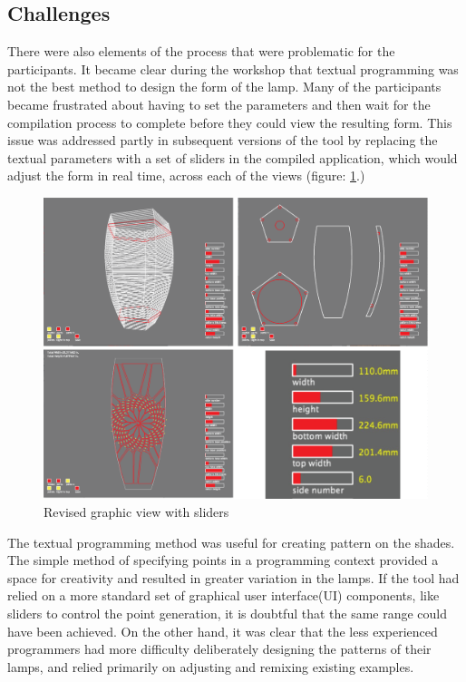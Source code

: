 \subsection{Challenges}
There were also elements of the process that were problematic for the participants. It became clear during the workshop that textual programming was not the best method to design the form of the lamp. Many of the participants became frustrated about having to set the parameters and then wait for the compilation process to complete before they could view the resulting form. This issue was addressed partly in subsequent versions of the tool by replacing the textual parameters with a set of sliders in the compiled application, which would adjust the form in real time, across each of the views (figure: \ref{fig:slider_interface}.)
\begin{center}
\begin{figure}[h!]
\includegraphics[width=\columnwidth]{images/slider_interface.png}
\caption{Revised graphic view with sliders}
\label{fig:slider_interface}
\end{figure}
\end{center}

The textual programming method was useful for creating pattern on the shades. The simple method of specifying points in a programming context provided a space for creativity and resulted in greater variation in the lamps. If the tool had relied on a more standard set of graphical user interface(UI) components, like sliders to control the point generation, it is doubtful that the same range could have been achieved. On the other hand, it was clear that the less experienced programmers had more difficulty deliberately designing the patterns of their lamps, and relied primarily on adjusting and remixing existing examples. 

